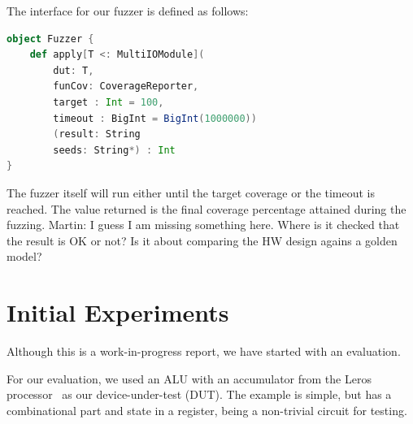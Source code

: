 \documentclass[conference]{IEEEtran}
\newcommand{\martin}[1]{{\color{blue} Martin: #1}}
\begin{document}
The interface for our fuzzer is defined as follows:
\begin{lstlisting}[captionpos=b,caption={Interface for the ChiselVerify fuzzer. It takes as parameter a \texttt{dut} and \texttt{chiselverify.coverage.CoverageReporter}, which is the verification plan used to define the functional coverage that will drive the fuzzing. It also takes in a target coverage percentage between 0 and 100, which defaults to 100, and a timeout which is set by default to 1'000'000. The second set of parameters are a result output file name, where all of the interesting tests and their resulting hit values will be written, as well as a variable number of file paths, which will be used as seeds for the mutation engine. },label={lst:dutexample},language=scala]
object Fuzzer {
    def apply[T <: MultiIOModule](
        dut: T, 
        funCov: CoverageReporter, 
        target : Int = 100,
        timeout : BigInt = BigInt(1000000))
        (result: String
        seeds: String*) : Int
}
\end{lstlisting}
The fuzzer itself will run either until the target coverage or the timeout is reached. The value returned is the final coverage percentage attained during the fuzzing.
\martin{I guess I am missing something here. Where is it checked that the result is OK or not? Is it about comparing the
HW design agains a golden model?}

\section{Initial Experiments}
\label{sec:eval}
%

Although this is a work-in-progress report, we have started with an evaluation.

For our evaluation, we used an ALU with an accumulator from the Leros processor~\cite{leros:arcs2019}
as our device-under-test (DUT).
The example is simple, but has a combinational part and state in a register, being
a non-trivial circuit for testing.
\end{document}
